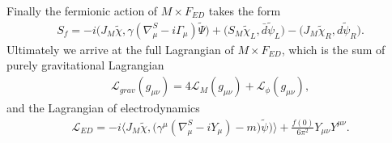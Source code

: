 Finally the fermionic action of $M\times F_{ED}$ takes the form
    \begin{align}
        S_f = -i\big(J_M\tilde{\chi}, \gamma(\nabla^S_\mu - i\Gamma_\mu)
        \tilde{\Psi}\big) + \big(S_M\tilde{\chi}_L, \bar{d}\tilde{\psi}_L\big) -
        \big(J_M\tilde{\chi}_R, d \tilde{\psi}_R\big).
    \end{align}
Ultimately we arrive at the full Lagrangian of $M\times F_{ED}$, which is the
sum of purely gravitational Lagrangian
    \begin{align}
        \mathcal{L}_{grav}(g_{\mu\nu})=4\mathcal{L}_M(g_{\mu\nu})+
        \mathcal{L}_\phi (g_{\mu\nu}),
    \end{align}
and the Lagrangian of electrodynamics
    \begin{align}
        \mathcal{L}_{ED} = -i\bigg\langle
        J_M\tilde{\chi},\big(\gamma^\mu(\nabla^S_\mu - iY_\mu) -m\big)\tilde{\psi})
        \bigg\rangle
        +\frac{f(0)}{6\pi^2} Y_{\mu\nu}Y^{\mu\nu}.
    \end{align}

